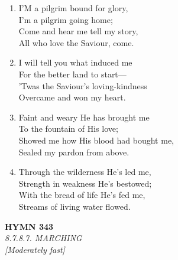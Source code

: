 \begin{enumerate}
    \item I'M a pilgrim bound for glory, \\
        I'm a pilgrim going home; \\
        Come and hear me tell my story, \\
        All who love the Saviour, come.

    \item I will tell you what induced me \\
        For the better land to start--- \\
        'Twas the Saviour's loving-kindness \\
        Overcame and won my heart.

    \item Faint and weary He has brought me \\
        To the fountain of His love; \\
        Showed me how His blood had bought me, \\
        Sealed my pardon from above.

    \item Through the wilderness He's led me, \\
        Strength in weakness He's bestowed; \\
        With the bread of life He's fed me, \\
        Streams of living water flowed.

\end{enumerate}

\newpage
\begin{center}
    {\Large \textbf{HYMN 343}}
    \\
    \textit{8.7.8.7. MARCHING}
    \\
    \textit{\small [Moderately fast]}
\end{center}
\vspace{1em}

